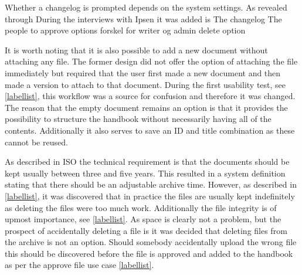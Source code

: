 


Whether a changelog is prompted depends on the system settings. 
As revealed through
During the interviews with Ipsen it was added is The changelog
The people to approve options
forskel for writer og admin
delete option

It is worth noting that it is also possible to add a new document without attaching any file.
The former design did not offer the option of attaching the file immediately but required that the user first made a new document and then made a version to attach to that document.
During the first usability test, see \cref{labellist}, this workflow was a source for confusion and therefore it was changed.
The reason that the empty document remains an option is that it provides the possibility to structure the handbook without necessarily having all of the contents.
Additionally it also serves to save an ID and title combination as these cannot be reused. 


%




As described in ISO the technical requirement is that the documents should be kept usually between three and five years.
This resulted in a system definition stating that there should be an adjustable archive time.
However, as described in \cref{labellist}, it was discovered that in practice the files are usually kept indefinitely as deleting the files were too much work.
Additionally the file integrity is of upmost importance, see \cref{labellist}.
As space is clearly not a problem, but the prospect of accidentally deleting a file is it was decided that deleting files from the archive is not an option.
Should somebody accidentally upload the wrong file this should be discovered before the file is approved and added to the handbook as per the approve file use case \cref{labellist}.


%


